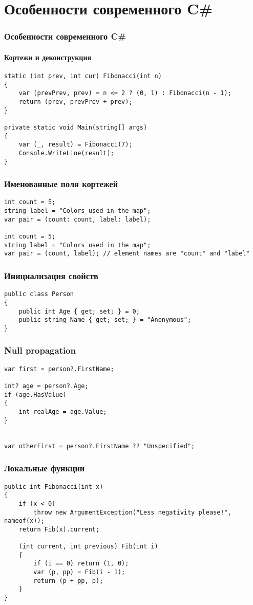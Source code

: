 \documentclass[xetex,mathserif,serif]{beamer}
\begin{document}
	\section{Особенности современного C\#}

	\begin{frame}[fragile]
		\frametitle{Особенности современного C\#}
		\framesubtitle{Кортежи и деконструкция}
		\begin{verbatim}
static (int prev, int cur) Fibonacci(int n)
{
    var (prevPrev, prev) = n <= 2 ? (0, 1) : Fibonacci(n - 1);
    return (prev, prevPrev + prev);
}

private static void Main(string[] args)
{
    var (_, result) = Fibonacci(7);
    Console.WriteLine(result);
}
		\end{verbatim}
	\end{frame}

	\begin{frame}[fragile]
		\frametitle{Именованные поля кортежей}
		\begin{verbatim}
int count = 5;
string label = "Colors used in the map";
var pair = (count: count, label: label);

int count = 5;
string label = "Colors used in the map";
var pair = (count, label); // element names are "count" and "label"
		\end{verbatim}
	\end{frame}

	\begin{frame}[fragile]
		\frametitle{Инициализация свойств}
		\begin{verbatim}
public class Person
{
    public int Age { get; set; } = 0;
    public string Name { get; set; } = "Anonymous";
}
		\end{verbatim}
	\end{frame}

	\begin{frame}[fragile]
		\frametitle{Null propagation}
		\begin{verbatim}
var first = person?.FirstName;

int? age = person?.Age;
if (age.HasValue)
{
    int realAge = age.Value;
}


var otherFirst = person?.FirstName ?? "Unspecified";
		\end{verbatim}
	\end{frame}

	\begin{frame}[fragile]
		\frametitle{Локальные функции}
		\begin{small}
			\begin{verbatim}
public int Fibonacci(int x)
{
    if (x < 0) 
        throw new ArgumentException("Less negativity please!", nameof(x));
    return Fib(x).current;

    (int current, int previous) Fib(int i)
    {
        if (i == 0) return (1, 0);
        var (p, pp) = Fib(i - 1);
        return (p + pp, p);
    }
}
			\end{verbatim}
		\end{small}
	\end{frame}
\end{document}
